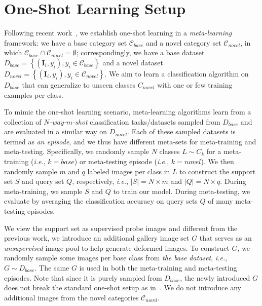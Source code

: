 \documentclass[10pt,letterpaper,twocolumn]{article}
\begin{document}
\section{One-Shot Learning Setup}



\label{sec:oneShotSetting}

Following recent work~\cite{matchingnet_1shot,Sachin2017,MAML,prototype_network,imaginaryData},
we establish one-shot learning in a \emph{meta-learning} framework:
we have a base category set $\mathcal{C}_{base}$ and a novel category
set $\mathcal{C}_{novel}$, in which $\mathcal{C}_{base}\cap\mathcal{C}_{novel}=\emptyset$;
correspondingly, we have a base dataset $D_{base}=\left\{ \left(\mathbf{I}_{i},y_{i}\right), y_{i}\in\mathcal{C}_{base}\right\} $ and a novel dataset $D_{novel}=\left\{ \left(\mathbf{I}_{i},y_{i}\right), y_{i}\in\mathcal{C}_{novel}\right\}$. We aim to learn a classification algorithm
on $D_{base}$ that can generalize to unseen classes $C_{novel}$
with one or few training examples per class.

To mimic the one-shot learning scenario, meta-learning algorithms
learn from a collection of \emph{$N$-way-$m$-shot} classification
tasks/datasets sampled from $D_{base}$ and are evaluated in a similar
way on $D_{novel}$. Each of these sampled datasets is termed as \emph{an
episode}, and we thus have different meta-sets for meta-training and
meta-testing. Specifically, we randomly sample $N$ classes $L\sim C_{k}$
for a meta-training (\emph{i.e.}, $k=base$) or meta-testing episode
(\emph{i.e.}, $k=novel$). We then randomly sample $m$ and $q$ labeled
images per class in $L$ to construct the support set $S$ and query
set $Q$, respectively, \emph{i.e.}, $|S|=N\times m$ and $|Q|=N\times q$.
During meta-training, we sample $S$ and $Q$ to train our model.
During meta-testing, we evaluate by averaging the classification accuracy
on query sets $Q$ of many meta-testing episodes.

We view the support set as supervised probe images and different from
the previous work, we introduce an additional gallery image set $G$
that serves as an \emph{unsupervised} image pool to help generate
deformed images. To construct $G$, we randomly sample some images
per base class from \emph{the base dataset}, \emph{i.e.}, $G\sim D_{base}$.
The same $G$ is used in both the meta-training and meta-testing episodes.
Note that since it is purely sampled from $D_{base}$, the newly introduced
$G$ does not break the standard one-shot setup as in~\cite{prototype_network,MAML,Sachin2017}.
We do not introduce any additional images from the novel categories
$\mathcal{C}_{novel}$.
\end{document}
